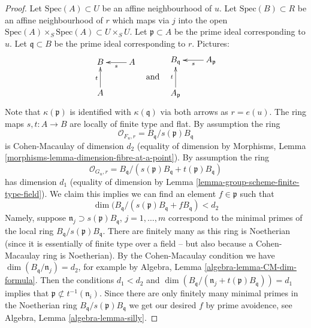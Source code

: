 \begin{proof}
Let $\text{Spec}(A) \subset U$ be an affine neighbourhood of $u$.
Let $\text{Spec}(B) \subset R$ be an affine neighbourhood of $r$
which maps via $j$ into the open
$\text{Spec}(A) \times_S \text{Spec}(A) \subset U \times_S U$.
Let $\mathfrak p \subset A$ be the prime ideal corresponding to $u$.
Let $\mathfrak q \subset B$ be the prime ideal corresponding to $r$.
Pictures:
$$
\vcenter{
\xymatrix{
B & A \ar[l]^s \\
A \ar[u]^t
}
}
\quad\text{and}\quad
\vcenter{
\xymatrix{
B_{\mathfrak q} & A_{\mathfrak p} \ar[l]^s \\
A_{\mathfrak p} \ar[u]^t
}
}
$$
Note that $\kappa(\mathfrak p)$ is identified with $\kappa(\mathfrak q)$
via both arrows as $r = e(u)$. The ring maps $s, t : A \to B$ are
locally of finite type and flat. By assumption the ring
$$
\mathcal{O}_{F_u, r} = B_{\mathfrak q}/s(\mathfrak p)B_{\mathfrak q}
$$
is Cohen-Macaulay of dimension $d_2$ (equality of dimension by
Morphisms, Lemma \ref{morphisms-lemma-dimension-fibre-at-a-point}).
By assumption the ring
$$
\mathcal{O}_{G_u, r}
=
B_{\mathfrak q}/(s(\mathfrak p)B_{\mathfrak q} + t(\mathfrak p)B_{\mathfrak q})
$$
has dimension $d_1$ (equality of dimension by
Lemma \ref{lemma-group-scheme-finite-type-field}).
We claim this implies we can find
an element $f \in \mathfrak p$ such that
$$
\dim(B_{\mathfrak q}/(s(\mathfrak p)B_{\mathfrak q} + fB_{\mathfrak q}) < d_2
$$
Namely, suppose $\mathfrak n_j \supset s(\mathfrak p)B_{\mathfrak q}$,
$j = 1, \ldots, m$ correspond to the minimal primes of the local ring
$B_{\mathfrak q}/s(\mathfrak p)B_{\mathfrak q}$.
There are finitely many as this ring is Noetherian (since it is essentially
of finite type over a field -- but also because a Cohen-Macaulay ring is
Noetherian). By the Cohen-Macaulay condition we have
$\dim(B_{\mathfrak q}/\mathfrak n_j) = d_2$, for example by
Algebra, Lemma \ref{algebra-lemma-CM-dim-formula}.
Then the conditions $d_1 < d_2$ and
$\dim(B_{\mathfrak q}/(\mathfrak n_j + t(\mathfrak p)B_{\mathfrak q})) = d_1$
implies that
$\mathfrak p \not \subset t^{-1}(\mathfrak n_i)$. Since there are only
finitely many minimal primes in the Noetherian ring
$B_{\mathfrak q}/s(\mathfrak p)B_{\mathfrak q}$ we get our desired $f$
by prime avoidence, see
Algebra, Lemma \ref{algebra-lemma-silly}.


\end{proof}

